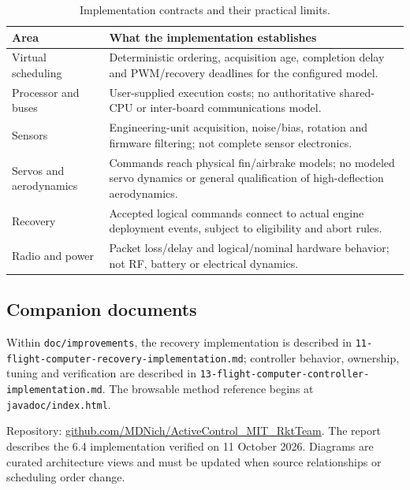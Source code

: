 \documentclass[10pt,letterpaper]{article}
\newcommand{\code}[1]{\nolinkurl{#1}}
\begin{document}
\begin{table}[htbp]\centering\small
\begin{tabularx}{\linewidth}{@{}p{3.7cm}Y@{}}\toprule
Area & What the implementation establishes\\\midrule
Virtual scheduling & Deterministic ordering, acquisition age, completion delay and PWM/recovery deadlines for the configured model.\\
Processor and buses & User-supplied execution costs; no authoritative shared-CPU or inter-board communications model.\\
Sensors & Engineering-unit acquisition, noise/bias, rotation and firmware filtering; not complete sensor electronics.\\
Servos and aerodynamics & Commands reach physical fin/airbrake models; no modeled servo dynamics or general qualification of high-deflection aerodynamics.\\
Recovery & Accepted logical commands connect to actual engine deployment events, subject to eligibility and abort rules.\\
Radio and power & Packet loss/delay and logical/nominal hardware behavior; not RF, battery or electrical dynamics.\\
\bottomrule\end{tabularx}
\caption{Implementation contracts and their practical limits.}
\end{table}

\subsection{Companion documents}
Within \code{doc/improvements}, the recovery implementation is described in
\code{11-flight-computer-recovery-implementation.md}; controller behavior,
ownership, tuning and verification are described in
\code{13-flight-computer-controller-implementation.md}. The browsable method
reference begins at \code{javadoc/index.html}.

Repository: \href{https://github.com/MDNich/ActiveControl_MIT_RktTeam}{github.com/MDNich/ActiveControl\_MIT\_RktTeam}.
The report describes the 6.4 implementation verified on 11 October 2026.
Diagrams are curated architecture views and must be updated when source
relationships or scheduling order change.
\end{document}

